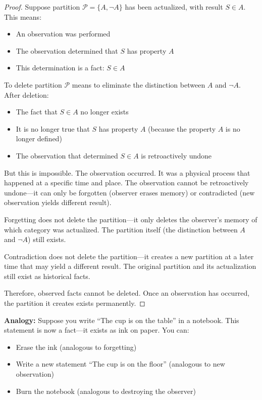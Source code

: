 \documentclass[twocolumn,10pt]{article}
\theoremstyle{definition}
\theoremstyle{remark}
\begin{document}
\begin{proof}
Suppose partition $\mathcal{P} = \{A, \neg A\}$ has been actualized, with result $S \in A$. This means:
\begin{itemize}
\item An observation was performed
\item The observation determined that $S$ has property $A$
\item This determination is a fact: $S \in A$
\end{itemize}

To delete partition $\mathcal{P}$ means to eliminate the distinction between $A$ and $\neg A$. After deletion:
\begin{itemize}
\item The fact that $S \in A$ no longer exists
\item It is no longer true that $S$ has property $A$ (because the property $A$ is no longer defined)
\item The observation that determined $S \in A$ is retroactively undone
\end{itemize}

But this is impossible. The observation occurred. It was a physical process that happened at a specific time and place. The observation cannot be retroactively undone—it can only be forgotten (observer erases memory) or contradicted (new observation yields different result).

\vspace{0.2cm}
\noindent Forgetting does not delete the partition—it only deletes the observer's memory of which category was actualized. The partition itself (the distinction between $A$ and $\neg A$) still exists.

\vspace{0.2cm}
\noindent Contradiction does not delete the partition—it creates a new partition at a later time that may yield a different result. The original partition and its actualization still exist as historical facts.

\vspace{0.2cm}
\noindent Therefore, observed facts cannot be deleted. Once an observation has occurred, the partition it creates exists permanently.
\end{proof}

\noindent\textbf{Analogy:} Suppose you write ``The cup is on the table'' in a notebook. This statement is now a fact—it exists as ink on paper. You can:
\begin{itemize}
\item Erase the ink (analogous to forgetting)
\item Write a new statement ``The cup is on the floor'' (analogous to new observation)
\item Burn the notebook (analogous to destroying the observer)
\end{itemize}
\end{document}
